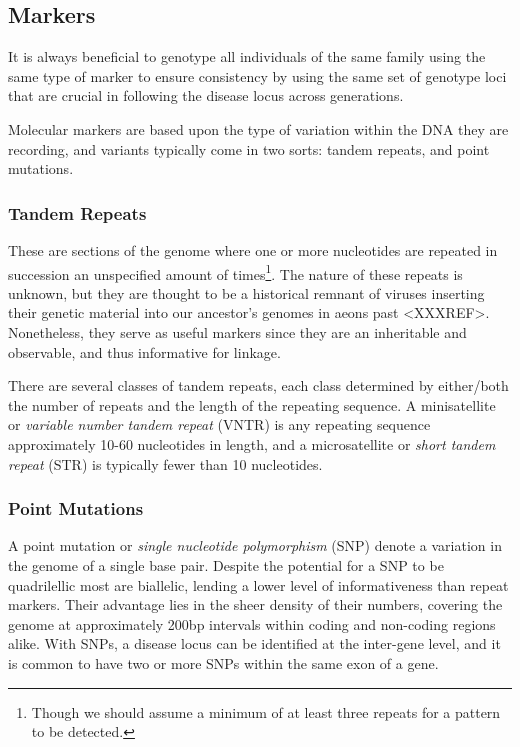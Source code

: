 \subsection{Markers}
It is always beneficial to genotype all individuals of the same family using the same type of marker to ensure consistency by using the same set of genotype loci that are crucial in following the disease locus across generations.

Molecular markers are based upon the type of variation within the DNA they are recording, and variants typically come in two sorts: tandem repeats, and point mutations.

\subsubsection{Tandem Repeats}

These are sections of the genome where one or more nucleotides are repeated in succession an unspecified amount of times\footnote{Though we should assume a minimum of at least three repeats for a pattern to be detected.}. The nature of these repeats is unknown, but they are thought to be a historical remnant of viruses inserting their genetic material into our ancestor's genomes in aeons past <XXXREF>.   Nonetheless, they serve as useful markers since they are an inheritable and observable, and thus informative for linkage.

There are several classes of tandem repeats, each class determined by either/both the number of repeats and the length of the repeating sequence. A \gls{minisatellite} or \textit{variable number tandem repeat} (\gls{VNTR}) is any repeating sequence approximately 10-60 nucleotides in length, and a \gls{microsatellite} or \textit{short tandem repeat} (\gls{STR}) is typically fewer than 10 nucleotides.

\subsubsection{Point Mutations}

A point mutation or \textit{single nucleotide polymorphism} (\gls{SNP}) denote a variation in the genome of a single base pair. Despite the potential for a SNP to be quadrilellic most are biallelic, lending a lower  level of informativeness than repeat markers. Their advantage lies in the sheer density of their numbers, covering the genome at approximately 200bp intervals within coding and non-coding regions alike. With SNPs, a disease locus can be identified at the inter-gene level, and it is common to have two or more SNPs within the same exon of a gene. 

